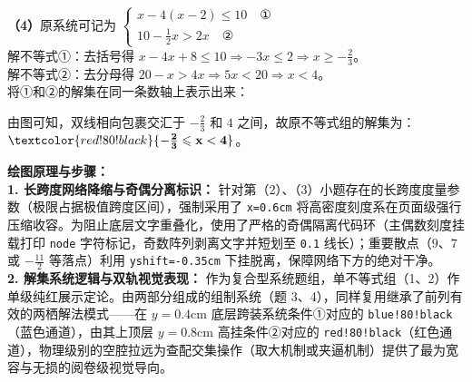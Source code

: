 \vspace{0.4cm}
\textbf{（4）}原系统可记为 $\begin{cases} x-4(x-2) \leqslant 10 \quad \text{①} \\ 10-\frac{1}{2}x > 2x \quad \text{②} \end{cases}$ \\
解不等式①：去括号得 $x-4x+8 \leqslant 10 \Rightarrow -3x \leqslant 2 \Rightarrow x \geqslant -\frac{2}{3}$。\\
解不等式②：去分母得 $20-x > 4x \Rightarrow 5x < 20 \Rightarrow x < 4$。\\
将①和②的解集在同一条数轴上表示出来：
\begin{center}
\end{center}
由图可知，双线相向包裹交汇于 $-\frac{2}{3}$ 和 $4$ 之间，故原不等式组的解集为：$\textcolor{red!80!black}{\mathbf{-\frac{2}{3} \leqslant x < 4}}$。

\vspace{0.4cm}
{\small\color{blue!70!black}
\textbf{绘图原理与步骤：}\\
\textbf{1. 长跨度网络降缩与奇偶分离标识：} 针对第（2）、（3）小题存在的长跨度度量参数（极限占据极值跨度区间），强制采用了 \texttt{x=0.6cm} 将高密度刻度系在页面级强行压缩收容。为阻止底层文字重叠化，使用了严格的奇偶隔离代码环（主偶数刻度挂载打印 \texttt{node} 字符标记，奇数阵列剥离文字并短划至 \texttt{0.1} 线长）；重要散点（$9$、$7$ 或 $-\frac{11}{2}$ 等落点）利用 \texttt{yshift=-0.35cm} 下挂脱离，保障网络下方的绝对干净。\\
\textbf{2. 解集系统逻辑与双轨视觉表现：} 作为复合型系统题组，单不等式组（1、2）作单级纯红展示定论。由两部分组成的组制系统（题 3、4），同样复用继承了前列有效的两栖解法模式——在 $y=0.4\mathrm{cm}$ 底层跨装系统条件①对应的 \texttt{blue!80!black}（蓝色通道），由其上顶层 $y=0.8\mathrm{cm}$ 高挂条件②对应的 \texttt{red!80!black}（红色通道），物理级别的空腔拉远为查配交集操作（取大机制或夹逼机制）提供了最为宽容与无损的阅卷级视觉导向。
}

